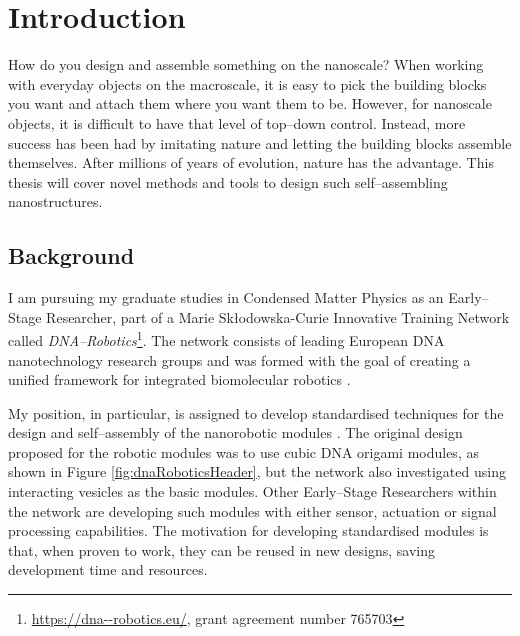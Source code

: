 
\chapter{Introduction}\label{ch:1-intro}

\minitoc

How do you design and assemble something on the nanoscale? When working with everyday objects on the macroscale, it is easy to pick the building blocks you want and attach them where you want them to be. However, for nanoscale objects, it is difficult to have that level of top--down control. Instead, more success has been had by imitating nature and letting the building blocks assemble themselves. After millions of years of evolution, nature has the advantage. This thesis will cover novel methods and tools to design such self--assembling nanostructures.

\section{Background}
I am pursuing my graduate studies in Condensed Matter Physics as an Early--Stage Researcher, part of a Marie Skłodowska-Curie Innovative Training Network called \emph{DNA--Robotics}\footnote{\url{https://dna--robotics.eu/}, grant agreement number 765703}. The network consists of leading European DNA nanotechnology research groups and was formed with the goal of creating a unified framework for integrated biomolecular robotics \cite{dnaroboticsResearch}.

My position, in particular, is assigned to develop standardised techniques for the design and self--assembly of the nanorobotic modules \cite{dnaroboticsESR12}. The original design proposed for the robotic modules was to use cubic DNA origami modules, as shown in Figure \ref{fig:dnaRoboticsHeader}, but the network also investigated using interacting vesicles as the basic modules. Other Early--Stage Researchers within the network are developing such modules with either sensor, actuation or signal processing capabilities. The motivation for developing standardised modules is that, when proven to work, they can be reused in new designs, saving development time and resources.

